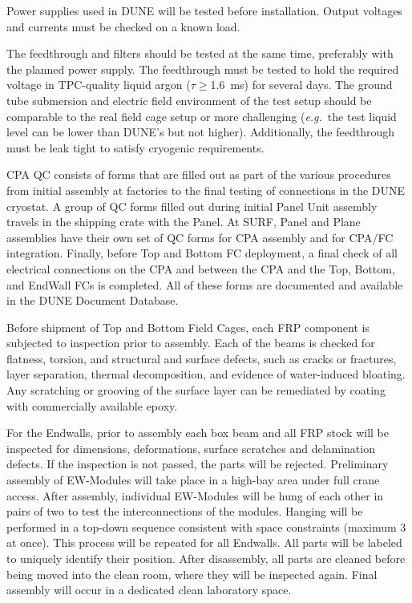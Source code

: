 Power supplies used in DUNE will be tested before installation.  Output voltages and currents must be checked on a known load. 

The feedthrough and filters should be tested at the same time, preferably with the planned power supply.  The feedthrough must be tested to hold the required voltage in TPC-quality liquid argon ($\tau\geq$\SI{1.6}{ms}) for several days.  The ground tube submersion and electric field environment of the test setup should be comparable to the real field cage setup or more challenging ({\it e.g.}\ the test liquid level can be lower than DUNE's but not higher).  Additionally, the feedthrough must be leak tight to satisfy cryogenic requirements.

CPA QC consists of forms that are filled out as part of the various procedures from initial assembly at factories to the final testing of connections in the DUNE cryostat.  A group of QC forms filled out during initial Panel Unit assembly travels in the shipping crate with the Panel.  At SURF, Panel and Plane assemblies have their own set of QC forms for CPA assembly and for CPA/FC integration.  Finally, before Top and Bottom FC deployment, a final check of all electrical connections on the CPA and between the CPA and the Top, Bottom, and EndWall FCs is completed.  All of these forms are documented and available in the DUNE Document Database.

Before shipment of Top and Bottom Field Cages, each FRP component is subjected to inspection prior to assembly. Each of the beams is checked for flatness, torsion, and structural and surface defects, such as cracks or fractures, layer separation, thermal decomposition, and evidence of water-induced bloating. Any scratching or grooving of the surface layer can be remediated by coating with commercially available epoxy.


For the Endwalls, prior to assembly each box beam and all FRP stock will be inspected for dimensions, deformations, surface scratches and delamination defects. If the inspection is not passed, the parts will be rejected.
Preliminary assembly of EW-Modules will take place in a high-bay area under full crane access. After assembly, individual EW-Modules will be hung of each other in pairs of two to test the interconnections of the modules. Hanging will be performed in a top-down sequence consistent with space constraints (maximum 3 at once). This process will be repeated for all Endwalls. All parts will be labeled to uniquely identify their position. After disassembly, all parts are cleaned before being moved into the clean room, where they will be inspected again. Final assembly will occur in a dedicated clean laboratory space.

